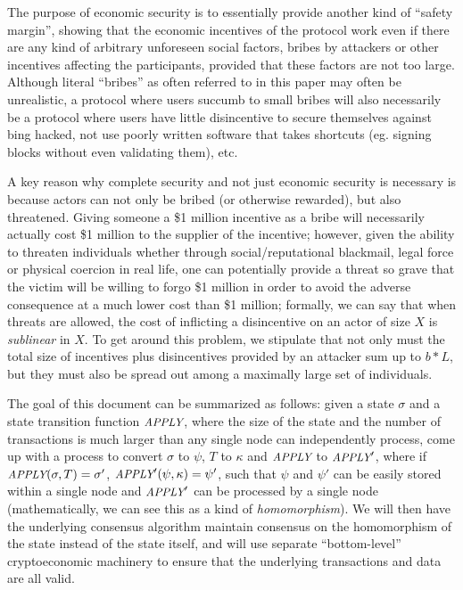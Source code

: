 \documentclass[11pt,a4paper]{article}
\theoremstyle{plain}
\theoremstyle{definition}
\theoremstyle{remark}
\newcommand{\makeintoafunction}[1]{\textit{\uppercase{\small #1}}}
\newcommand{\APPLY}{\makeintoafunction{apply}}
\begin{document}
The purpose of economic security is to essentially provide another kind of ``safety margin'', showing that the economic incentives of the protocol work even if there are any kind of arbitrary unforeseen social factors, bribes by attackers or other incentives affecting the participants, provided that these factors are not too large. Although literal ``bribes'' as often referred to in this paper may often be unrealistic, a protocol where users succumb to small bribes will also necessarily be a protocol where users have little disincentive to secure themselves against bing hacked, not use poorly written software that takes shortcuts (eg. signing blocks without even validating them), etc.

A key reason why complete security and not just economic security is necessary is because actors can not only be bribed (or otherwise rewarded), but also threatened. Giving someone a \$1 million incentive as a bribe will necessarily actually cost \$1 million to the supplier of the incentive; however, given the ability to threaten individuals whether through social/reputational blackmail, legal force or physical coercion in real life, one can potentially provide a threat so grave that the victim will be willing to forgo \$1 million in order to avoid the adverse consequence at a much lower cost than \$1 million; formally, we can say that when threats are allowed, the cost of inflicting a disincentive on an actor of size $X$ is \emph{sublinear} in $X$. To get around this problem, we stipulate that not only must the total size of incentives plus disincentives provided by an attacker sum up to $b * L$, but they must also be spread out among a maximally large set of individuals.

The goal of this document can be summarized as follows: given a state $\sigma$ and a state transition function $\APPLY$, where the size of the state and the number of transactions is much larger than any single node can independently process, come up with a process to convert $\sigma$ to $\psi$, $T$ to $\kappa$ and $\APPLY$ to $\APPLY'$, where if $\APPLY(\sigma, T) = \sigma'$, $\APPLY'(\psi, \kappa) = \psi'$, such that $\psi$ and $\psi'$ can be easily stored within a single node and $\APPLY'$ can be processed by a single node (mathematically, we can see this as a kind of \emph{homomorphism}). We will then have the underlying consensus algorithm maintain consensus on the homomorphism of the state instead of the state itself, and will use separate ``bottom-level'' cryptoeconomic machinery to ensure that the underlying transactions and data are all valid.
\end{document}
